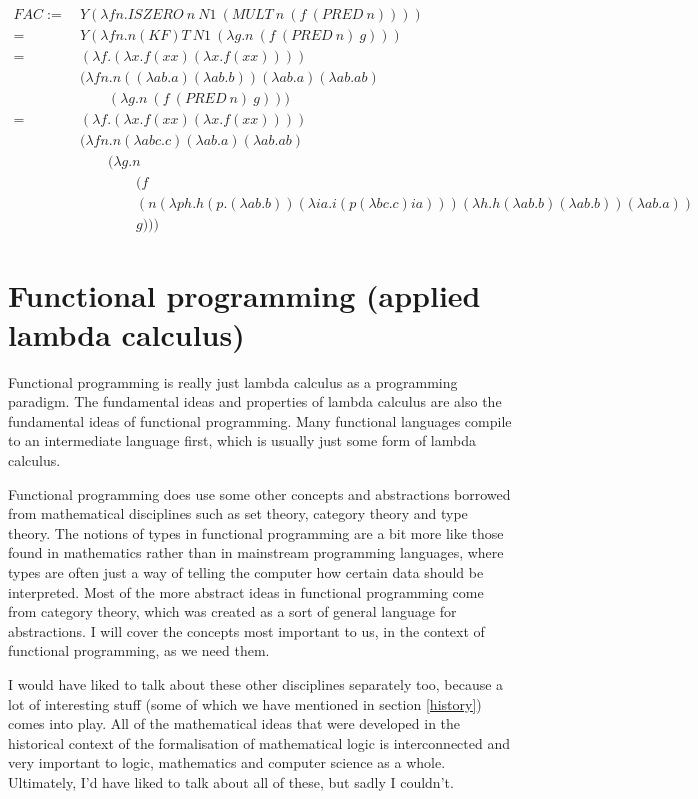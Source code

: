 \documentclass[11pt]{article}
\begin{document}
\begin{align*}
	FAC :=\ &Y(\lambda fn.ISZERO\ n\ N1\ (MULT\ n\ (f\ (PRED\ n))))\\
	=\ &Y(\lambda fn.n(KF)T\ N1\ (\lambda g.n\ (f\ (PRED\ n)\ g)))\\
	=\ &(\lambda f.(\lambda x.f(xx)(\lambda x.f(xx))))\\
	&(\lambda fn.n((\lambda ab.a)(\lambda ab.b))(\lambda ab.a)(\lambda ab.ab)\\
	&\qquad(\lambda g.n\ (f\ (PRED\ n)\ g)))\\
	=\ &(\lambda f.(\lambda x.f(xx)(\lambda x.f(xx))))\\
	&(\lambda fn.n(\lambda abc.c)(\lambda ab.a)(\lambda ab.ab)\\
	&\qquad(\lambda g.n\\
	&\qquad\qquad(f\\
	&\qquad\qquad(n(\lambda ph.h(p.(\lambda ab.b))(\lambda ia.i(p(\lambda bc.c)ia)))(\lambda h.h(\lambda ab.b)(\lambda ab.b))(\lambda ab.a))\\
	&\qquad\qquad g)))
\end{align*}

\section{Functional programming (applied lambda calculus)}\label{functional_programming}

Functional programming is really just lambda calculus as a programming
paradigm. The fundamental ideas and properties of lambda calculus are also the
fundamental ideas of functional programming. Many functional languages compile
to an intermediate language first, which is usually just some form of lambda
calculus.

Functional programming does use some other concepts and abstractions borrowed
from mathematical disciplines such as set theory, category theory and type
theory. The notions of types in functional programming are a bit more like
those found in mathematics rather than in mainstream programming languages,
where types are often just a way of telling the computer how certain data
should be interpreted. Most of the more abstract ideas in functional
programming come from category theory, which was created as a sort of general
language for abstractions. I will cover the concepts most important to us, in
the context of functional programming, as we need them.

I would have liked to talk about these other disciplines separately too,
because a lot of interesting stuff (some of which we have mentioned in section
\ref{history}) comes into play. All of the mathematical ideas that were
developed in the historical context of the formalisation of mathematical logic
is interconnected and very important to logic, mathematics and computer science
as a whole. Ultimately, I'd have liked to talk about all of these, but sadly I
couldn't.
\end{document}
